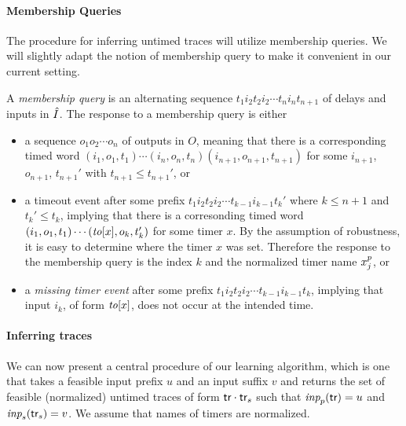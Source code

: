 
\paragraph{Membership Queries}
The procedure for inferring untimed traces will utilize membership queries.
We will slightly adapt the notion of membership query to make it convenient
in our current setting.

A {\em membership query} is an alternating sequence
$t_1i_2t_2i_2 \cdots t_ni_nt_{n+1}$ of delays and inputs in $\hat{I}$.
The response to a membership query is either
\begin{itemize}
\item
  a sequence $o_1 o_2 \cdots o_n$ of outputs in $O$, meaning that there is
  a corresponding timed word $(i_1, o_1, t_1) \cdots (i_n, o_n, t_n)(i_{n+1}, o_{n+1}, t_{n+1})$ for some $i_{n+1}$, $o_{n+1}$, $t_{n+1}'$ with $t_{n+1} \leq t_{n+1}'$,
  or
\item
  a timeout event after some prefix $t_1i_2t_2i_2 \cdots t_{k-1}i_{k-1}t_{k}'$
  where $k \leq n+1$ and $t_k' \leq t_k$, implying that  there is
  a corresonding timed word $(i_1, o_1, t_1) \cdots (\mathit{to}[x], o_k, t_k')$
  for some timer $x$. By the assumption of robustness, it is easy to
  determine where the timer $x$ was set. Therefore the response to the
  membership query is the index $k$ and the normalized timer name
  $x_{j}^{p}$, or
\item
  a {\em missing timer event} after some prefix
  $t_1i_2t_2i_2 \cdots t_{k-1}i_{k-1}t_{k}$, implying that input $i_k$, of
  form $\mathit{to}[x]$, does not occur at the intended time.
\end{itemize}

\paragraph{Inferring traces}
We can now present a central procedure of our learning algorithm,
which is one that 
takes a feasible input prefix $u$ and an input suffix $v$ and returns the set of
feasible (normalized) untimed traces of form $\textsf{tr}\cdot\textsf{tr}_s$ such that
$\textit{inp}_p(\textsf{tr}) = u$ and $\textit{inp}_s(\textsf{tr}_s) = v$.
We assume that names of timers are normalized.

